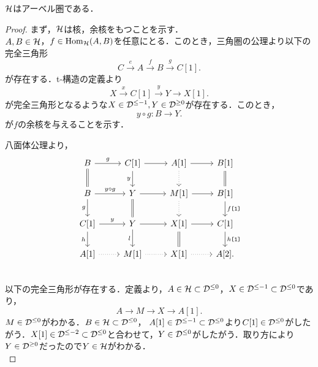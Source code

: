 \begin{prop}\cite[p.33]{BBD}
	${\mathcal H}$はアーベル圏である．
\end{prop}
\begin{proof}
	まず，${\mathcal H}$は核，余核をもつことを示す．\\
	$A,B\in{\mathcal H}$，$f\in\operatorname{\mathrm{Hom}}_{{\mathcal H}}(A,B)$を任意にとる．このとき，三角圏の公理より以下の完全三角形
	\[C\xrightarrow{e}A\xrightarrow{f}B\xrightarrow{g}C[1].\]
	が存在する．t-構造の定義より
	\[X\xrightarrow{x}C[1]\xrightarrow{y}Y\rightarrow X[1].\]
	が完全三角形となるような$X\in {\mathcal D}^{\le -1},Y\in {\mathcal D}^{\ge 0}$が存在する．このとき，
	\[y\circ g\colon B\rightarrow Y.\]
	が$f$の余核を与えることを示す．

八面体公理より，
			\[
		\begin{tikzcd}
			B \ar[r,"g"]\ar[d,equal]& C[1]\ar[r,]\ar[d,"y",swap]& A[1]\ar[d,dotted] \ar[r]& B[1]\ar[d,equal]\\
			B \ar[r,"y\circ g"]\ar[d,"g",swap]& Y\ar[r]\ar[d,equal]& M[1]\ar[d,dotted] \ar[r]& B[1]\ar[d,"f\texttt{[1]}"]\\
			C[1] \ar[r,"y"]\ar[d,"h",swap]& Y\ar[r]\ar[d,"l",swap]& X[1] \ar[r]\ar[d,equal]& C[1]\ar[d,"h\texttt{[1]}"]\\
			A[1] \ar[r,dotted]& M[1]\ar[r,dotted]& X[1] \ar[r,dotted]& A[2].\\
		\end{tikzcd}
			\]
以下の完全三角形が存在する．定義より，$A\in{\mathcal H}\subset{\mathcal D}^{\le 0}$，$X\in{\mathcal D}^{\le -1}\subset{\mathcal D}^{\le 0}$であり，
	\[A\rightarrow M\rightarrow X\rightarrow A[1].\]
	$M\in{\mathcal D}^{\le 0}$がわかる．$B\in{\mathcal H}\subset{\mathcal D}^{\le 0}$， $A[1]\in {\mathcal D}^{\le -1}\subset {\mathcal D}^{\le 0}$より$C[1]\in{\mathcal D}^{\le 0}$がしたがう．$X[1]\in{\mathcal D}^{\le -2}\subset{\mathcal D}^{\le 0}$と合わせて，$Y\in{\mathcal D}^{\le 0}$がしたがう．取り方により$Y\in{\mathcal D}^{\ge 0}$だったので$Y\in{\mathcal H}$がわかる．\\

\end{proof}
